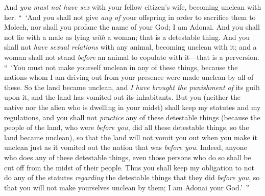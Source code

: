 \begin{biblechapter}
\verse And \textit{you must not have sex} with your fellow citizen’s wife, becoming unclean with her.
\verse “ ‘And you shall not give \textit{any of} your offspring in order to sacrifice them to Molech, nor shall you profane the name of your God; I am Adonai.
\verse And you shall not lie with a male as lying \textit{with} a woman; that is a detestable thing.
\verse And you shall not \textit{have sexual relations} with any animal, becoming unclean with it; and a woman shall not stand \textit{before} an animal to copulate with it—that is a perversion.
\verse “ ‘You must not make yourself unclean in any of these things, because the nations whom I am driving out from your presence were made unclean by all of these.
\verse So the land became unclean, and \textit{I have brought the punishment of} its guilt upon it, and the land has vomited out its inhabitants.
\verse But you (neither the native nor the alien who is dwelling in your midst) shall keep my statutes and my regulations, and you shall not \textit{practice} any of these detestable things
\verse (because the people of the land, who were \textit{before you}, did all these detestable things, so the land became unclean),
\verse so that the land will not vomit you out when you make it unclean just as it vomited out the nation that was \textit{before you}.
\verse Indeed, anyone who does any of these detestable things, even those persons who do so shall be cut off from the midst of their people.
\verse Thus you shall keep my obligation to not do any of the statutes \textit{regarding} the detestable things that they did \textit{before you}, so that you will not make yourselves unclean by them; I am Adonai your God.’ ”
\end{biblechapter}

